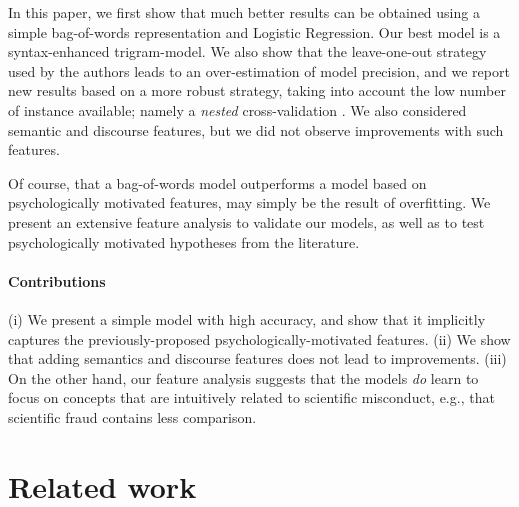 \documentclass[11pt,letterpaper]{article}
\begin{document}
In this paper, we first show that much better results can be obtained using a simple bag-of-words representation and Logistic Regression. 
Our best model is a syntax-enhanced trigram-model. We also show that the leave-one-out strategy used by the authors leads to an over-estimation of model precision, and we report new results based on a more robust strategy, taking into account the low number of instance available; namely a {\em nested} cross-validation \cite{varma_bias_2006,scheffer_error_1999}. We also considered semantic and discourse features, but we did not observe improvements with such features. 

Of course, that a bag-of-words model outperforms a model based on psychologically motivated features, may simply be the result of overfitting. We present an extensive feature analysis to validate our models, as well as to test psychologically motivated hypotheses from the literature. 

\paragraph{Contributions}
(i) We present a simple model with high accuracy, and show that it implicitly captures the previously-proposed psychologically-motivated features. 
    (ii) We show that adding semantics and discourse features does not lead to improvements.
    (iii) On the other hand, our feature analysis suggests that the models {\em do} learn to focus on concepts that are intuitively related to scientific misconduct, e.g., that scientific fraud contains less comparison. 


\section{Related work}
\end{document}
